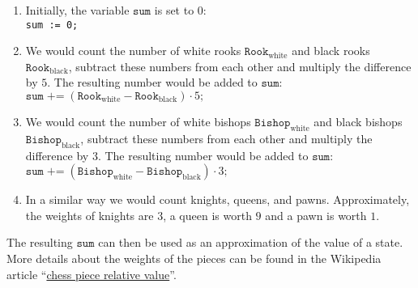 \begin{enumerate}
\item Initially, the variable $\texttt{sum}$ is set to $0$:
      \\[0.2cm]
      \hspace*{1.3cm}
      \texttt{sum := 0;}
\item We would count the number of white rooks $\texttt{Rook}_{\mathrm{white}}$ and black rooks $\texttt{Rook}_{\mathrm{black}}$,
      subtract these numbers from each other and multiply the difference by $5$.  
      The resulting number would be added to $\texttt{sum}$:
      \\[0.2cm]
      \hspace*{1.3cm}
      $\texttt{sum} \;\texttt{+=}\; (\texttt{Rook}_{\mathrm{white}} - \texttt{Rook}_{\mathrm{black}}) \cdot 5\texttt{;}$
\item We would count the number of white bishops $\texttt{Bishop}_{\mathrm{white}}$ and black bishops
      $\texttt{Bishop}_{\mathrm{black}}$,
      subtract these numbers from each other and multiply the difference by $3$.  
      The resulting number would be added to $\texttt{sum}$:
      \\[0.2cm]
      \hspace*{1.3cm}
      $\texttt{sum} \;\texttt{+=}\; (\texttt{Bishop}_{\mathrm{white}} - \texttt{Bishop}_{\mathrm{black}}) \cdot 3\texttt{;}$
\item In a similar way we would count knights, queens, and pawns.  Approximately, the weights of
      knights are $3$, a queen is worth $9$ and a pawn is worth $1$.
\end{enumerate}
The resulting $\texttt{sum}$ can then be used as an approximation of the value of a state.
More details about the weights of the pieces can be found in the Wikipedia article 
``\href{https://en.wikipedia.org/wiki/Chess_piece_relative_value}{chess piece relative value}''.



